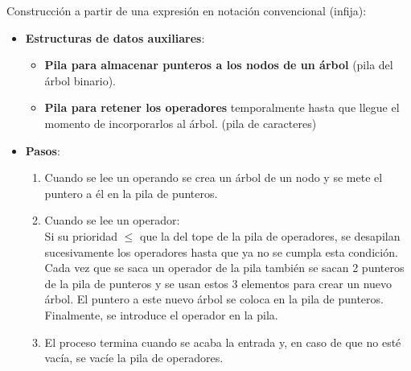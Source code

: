 \documentclass{article}
\begin{document}
Construcción a partir de una expresión en notación convencional (infija):
\begin{itemize}
    \item \textbf{Estructuras de datos auxiliares}:
    \begin{itemize}
        \item \textbf{Pila para almacenar punteros a los nodos de un árbol} (pila del árbol binario).
        \item \textbf{Pila para retener los operadores} temporalmente hasta que llegue el momento de incorporarlos al árbol. (pila de caracteres)
    \end{itemize}

    \item \textbf{Pasos}:
    \begin{enumerate}
        \item Cuando se lee un operando se crea un árbol de un nodo y se mete el puntero a él en la pila de punteros.

        \item Cuando se lee un operador: \\
        Si su prioridad $\leq$ que la del tope de la pila de operadores, se desapilan sucesivamente los operadores hasta que ya no se cumpla esta condición. \\
        Cada vez que se saca un operador de la pila también se sacan 2 punteros de la pila de punteros y se usan estos 3 elementos para crear un nuevo árbol. El puntero a este nuevo árbol se coloca en la pila de punteros. \\
        Finalmente, se introduce el operador en la pila.

        \item El proceso termina cuando se acaba la entrada y, en caso de que no esté vacía, se vacíe la pila de operadores.
    \end{enumerate}
\end{itemize}

\end{document}
